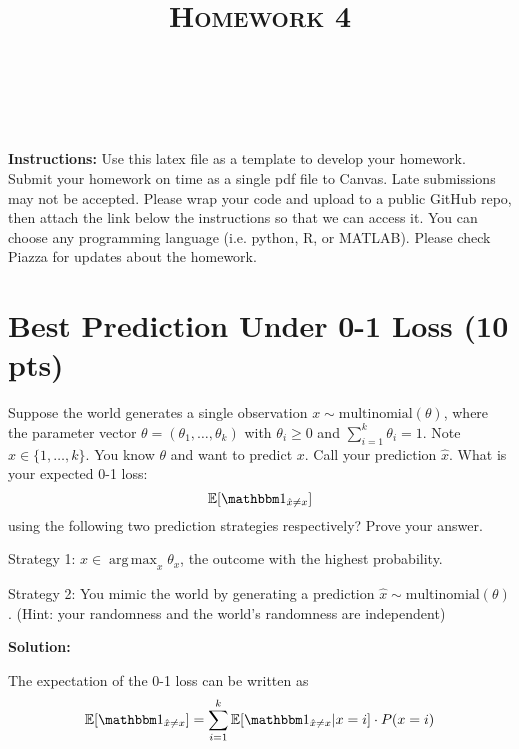 \documentclass[a4paper]{article}
\title{\textsc{Homework 4}} %
\author{
\red{$>>$Huzaifa Mustafa Unjhawala$<<$} \\
\red{$>>$ID HERE$<<$}\\
}
\date{}
\theoremstyle{definition}
\DeclareMathOperator*{\argmax}{arg\,max}
\def\E{\mathbb E}
\def\ind{\mathbbm 1}
\begin{document}
\maketitle 


\textbf{Instructions:} Use this latex file as a template to develop your homework. Submit your homework on time as a single pdf file to Canvas. Late submissions may not be accepted. Please wrap your code and upload to a public GitHub repo, then attach the link below the instructions so that we can access it. You can choose any programming language (i.e. python, R, or MATLAB). Please check Piazza for updates about the homework.

\section{Best Prediction Under 0-1 Loss (10 pts)}
Suppose the world generates a single observation $x \sim \mbox{multinomial}(\theta)$, where the parameter vector $\theta=(\theta_1, \ldots, \theta_k)$ with $\theta_i\ge 0$ and $\sum_{i=1}^k \theta_i=1$.  Note $x \in \{1, \ldots, k\}$.
You know $\theta$ and want to predict $x$. 
Call your prediction $\hat x$.  What is your expected 0-1 loss: 
$$\E[\ind_{\hat x \neq x}]$$
using the following two prediction strategies respectively?  Prove your answer.


Strategy 1: $\hat x \in \argmax_x \theta_x$, the outcome with the highest probability.

Strategy 2: You mimic the world by generating a prediction $\hat x \sim \mbox{multinomial}(\theta)$.  (Hint: your randomness and the world's randomness are independent)


\textbf{Solution:}

The expectation of the 0-1 loss can be written as
\begin{align*}
    \E[\ind_{\hat x \neq x}] &= \sum_{i=1}^k \E[\ind_{\hat x \neq x} | x=i] \cdot P(x=i) \\
\end{align*}
\end{document}
